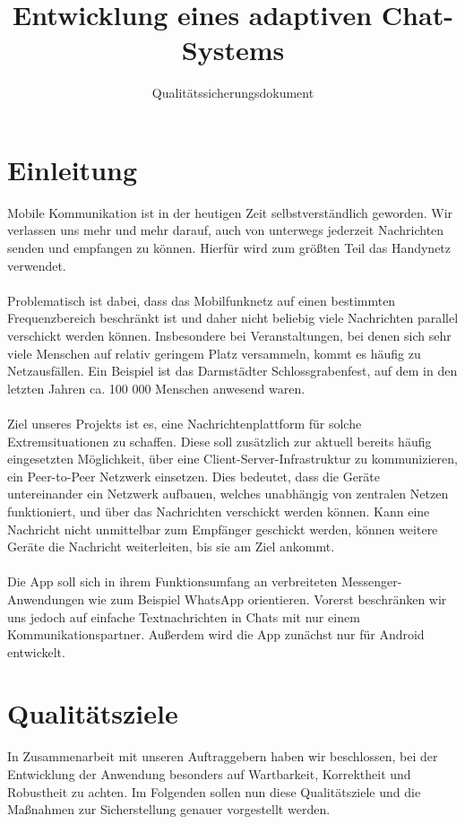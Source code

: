 \documentclass[accentcolor=tud0b,12pt,paper=a4]{tudreport}
\title{Entwicklung eines adaptiven Chat-Systems}
\subtitle{Qualitätssicherungsdokument}
\begin{document}
  \maketitle
  \tableofcontents

  \chapter{Einleitung}
    Mobile Kommunikation ist in der heutigen Zeit selbstverständlich geworden. Wir verlassen uns mehr und mehr darauf, auch von unterwegs jederzeit Nachrichten senden und empfangen zu können. Hierfür wird zum größten Teil das Handynetz verwendet.\\\\
    Problematisch ist dabei, dass das Mobilfunknetz auf einen bestimmten Frequenzbereich beschränkt ist und daher nicht beliebig viele Nachrichten parallel verschickt werden können. Insbesondere bei Veranstaltungen, bei denen sich sehr viele Menschen auf relativ geringem Platz versammeln, kommt es häufig zu Netzausfällen. Ein Beispiel ist das Darmstädter Schlossgrabenfest, auf dem in den letzten Jahren ca. 100 000 Menschen anwesend waren.\\\\
    Ziel unseres Projekts ist es, eine Nachrichtenplattform für solche Extremsituationen zu schaffen. Diese soll zusätzlich zur aktuell bereits häufig eingesetzten Möglichkeit, über eine Client-Server-Infrastruktur zu kommunizieren, ein Peer-to-Peer Netzwerk einsetzen. Dies bedeutet, dass die Geräte untereinander ein Netzwerk aufbauen, welches unabhängig von zentralen Netzen funktioniert, und über das Nachrichten verschickt werden können. Kann eine Nachricht nicht unmittelbar zum Empfänger geschickt werden, können weitere Geräte die Nachricht weiterleiten, bis sie am Ziel ankommt.\\\\
    Die App soll sich in ihrem Funktionsumfang an verbreiteten Messenger-Anwendungen wie zum Beispiel WhatsApp orientieren. Vorerst beschränken wir uns jedoch auf einfache Textnachrichten in Chats mit nur einem Kommunikationspartner. Außerdem wird die App zunächst nur für Android entwickelt.

  \chapter{Qualitätsziele}
    In Zusammenarbeit mit unseren Auftraggebern haben wir beschlossen, bei der Entwicklung der Anwendung besonders auf Wartbarkeit, Korrektheit und Robustheit zu achten. Im Folgenden sollen nun diese Qualitätsziele und die Maßnahmen zur Sicherstellung genauer vorgestellt werden.
\end{document}
